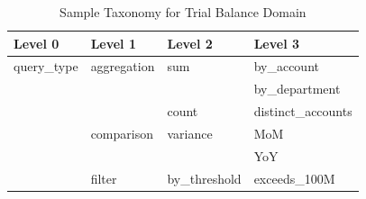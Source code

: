 \begin{table}[H]
\centering
\caption{Sample Taxonomy for Trial Balance Domain}
\label{tab:tb-taxonomy}
\begin{tabular}{llll}
\toprule
\textbf{Level 0} & \textbf{Level 1} & \textbf{Level 2} & \textbf{Level 3} \\
\midrule
query\_type & aggregation & sum & by\_account \\
            &             &     & by\_department \\
            &             & count & distinct\_accounts \\
            & comparison & variance & MoM \\
            &            &          & YoY \\
            & filter & by\_threshold & exceeds\_100M \\
\bottomrule
\end{tabular}
\end{table}

\newpage